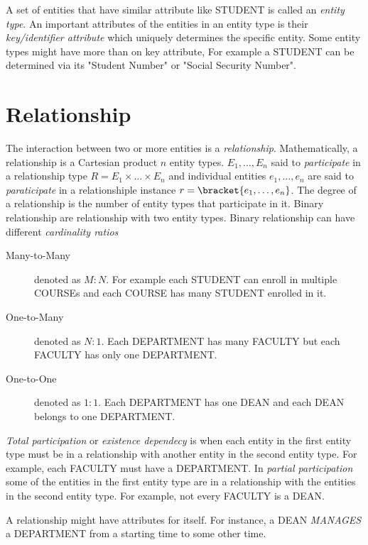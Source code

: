 A set of entities that have similar attribute like STUDENT is called an \textit{entity type}. An important attributes of the entities in an entity type is their \textit{key/identifier attribute} which uniquely determines the specific entity. Some entity types might have more than on key attribute, For example a STUDENT can be determined via its "Student Number" or "Social Security Number".

\section{Relationship}
The interaction between two or more entities is a \textit{relationship}. Mathematically, a relationship is a Cartesian product \(n\) entity types. \(E_1, \dots , E_n\) said to \textit{participate} in a relationship type \(R = E_1 \times \dots \times E_n\) and individual entities \(e_1, \dots , e_n\) are said to \textit{paraticipate} in a relationshiple instance \(r = \bracket{e_1, \dots ,e_n}\). The degree of a relationship is the number of entity types that participate in it. Binary relationship are relationship with two entity types. Binary relationship can have different \textit{cardinality ratios}
\begin{description}
    \item [Many-to-Many] denoted as \(M:N\). For example each STUDENT can enroll in multiple COURSEs and each COURSE has many STUDENT enrolled in it.
    \item [One-to-Many] denoted as \(N:1\). Each DEPARTMENT has many FACULTY but each FACULTY has only one DEPARTMENT. 
    \item [One-to-One] denoted as \(1:1\). Each DEPARTMENT has one DEAN and each DEAN belongs to one DEPARTMENT.
\end{description}

\textit{Total participation} or \textit{existence dependecy} is when each entity in the first entity type must be in a relationship with another entity in the second entity type. For example, each FACULTY must have a DEPARTMENT. In \textit{partial participation} some of the entities in the first entity type are in a relationship with the entities in the second entity type. For example, not every FACULTY is a DEAN. 

A relationship might have attributes for itself. For instance, a DEAN \textit{MANAGES} a DEPARTMENT from a starting time to some other time. 

